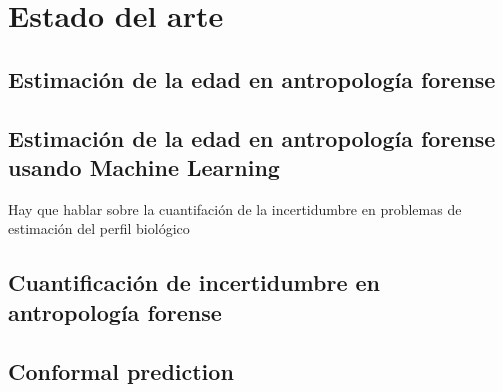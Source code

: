 \chapter{Estado del arte}


\section{Estimación de la edad en antropología forense}





\section{Estimación de la edad en antropología forense usando Machine Learning}

Hay que hablar sobre la cuantifación de la incertidumbre en problemas de estimación del perfil biológico




\section{Cuantificación de incertidumbre en antropología forense}



\section{Conformal prediction}




